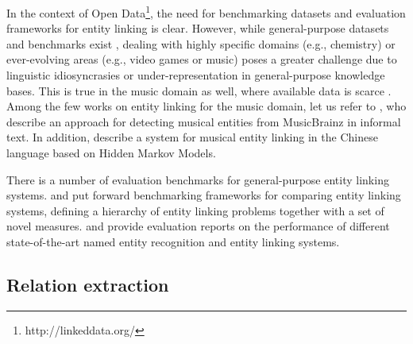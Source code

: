In the context of Open Data\footnote{http://linkeddata.org/}, the need for benchmarking datasets and evaluation frameworks for entity linking is clear. However, while general-purpose datasets and benchmarks exist \citep{Usbeck2015}, dealing with highly specific domains (e.g., chemistry) or ever-evolving areas (e.g., video games or music) poses a greater challenge due to linguistic idiosyncrasies or under-representation in general-purpose knowledge bases. This is true in the music domain as well, where available data is scarce \citep{Pereira2014}. %
Among the few works on entity linking for the music domain, let us refer to \cite{Gruhl2009}, who describe an approach for detecting musical entities from MusicBrainz in informal text. In addition, \cite{Zhang2009} describe a system for musical entity linking in the Chinese language based on Hidden Markov Models. 

There is a number of evaluation benchmarks for general-purpose entity linking systems. \cite{Cornolti2013} and \cite{Usbeck2015} put forward benchmarking frameworks for comparing entity linking systems, defining a hierarchy of entity linking problems together with a set of novel measures. \cite{Rizzo2014} and \cite{Gangemi2013} provide evaluation reports on the performance of different state-of-the-art named entity recognition and entity linking systems. %



\subsection{Relation extraction}
\label{sec:SOA:nlu:relation_extraction}


